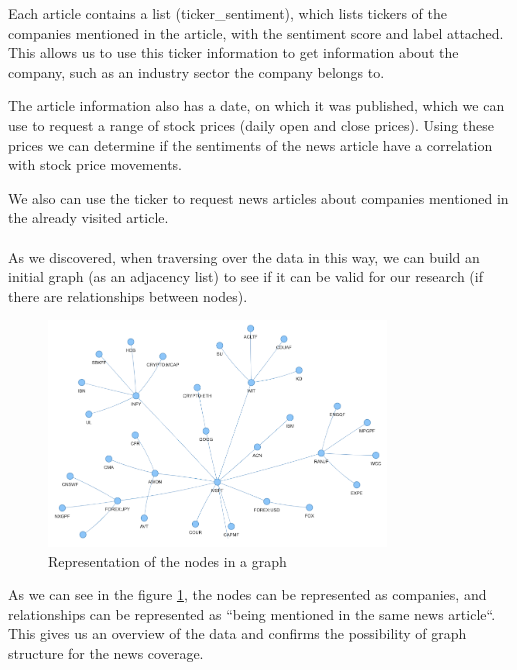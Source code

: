 \noindent Each article contains a list (ticker\_sentiment), which lists tickers of the companies mentioned in the article, with the sentiment score and label attached. This allows us to use this ticker information to get information about the company, such as an industry sector the company belongs to.

\noindent The article information also has a date, on which it was published, which we can use to request a range of stock prices (daily open and close prices). Using these prices we can determine if the sentiments of the news article have a correlation with stock price movements.

\noindent We also can use the ticker to request news articles about companies mentioned in the already visited article.
\\
\\
\noindent As we discovered, when traversing over the data in this way, we can build an initial graph (as an adjacency list) to see if it can be valid for our research (if there are relationships between nodes).



\begin{figure}[h]
 \centering
 \includegraphics[width=0.8\textwidth]{images/nodes-representation-graph.png}
 \caption{Representation of the nodes in a graph }
 \label{fig:nodes-representation-as-graph}
\end{figure}



As we can see in the figure \ref{fig:nodes-representation-as-graph}, the nodes can be represented as companies, and relationships can be represented as ``being mentioned in the same news article``. This gives us an overview of the data and confirms the possibility of graph structure for the news coverage.



